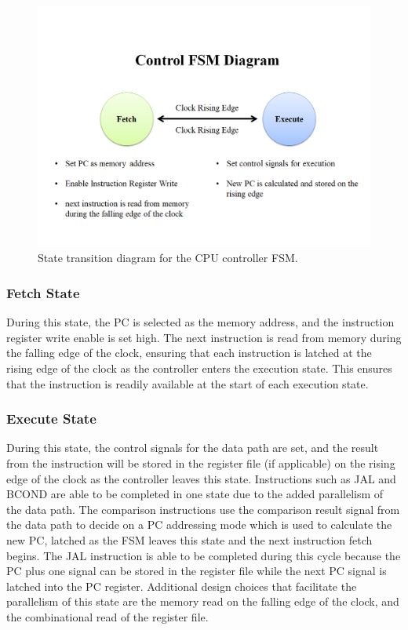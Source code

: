 \documentclass[10pt, portrait, letterpaper]{article}
\begin{document}
  \begin{figure}[h]
    \centering
    \includegraphics[width=5in]{fsm diagram.PNG}
    \caption{State transition diagram for the CPU controller FSM.}\label{fig:fsm}
  \end{figure}

  \subsubsection{Fetch State}
  During this state, the PC is selected as the memory address, and the 
  instruction register write enable is set high. 
  The next instruction is read from memory during the falling edge of the 
  clock, ensuring that each instruction is latched at the rising edge of the 
  clock as the controller enters the execution state. 
  This ensures that the instruction is readily
  available at the start of each execution state. 

  \subsubsection{Execute State}
  During this state, the control signals for the data path are set, 
  and the result from the instruction will be stored in the 
  register file (if applicable)
  on the rising edge of the clock as the controller leaves this state.
  Instructions such as JAL and BCOND are able to be completed in 
  one state due to the added parallelism of the data path.
  The comparison instructions use the comparison result signal 
  from the data path to decide on a PC addressing mode which is used 
  to calculate the new PC, latched as the FSM leaves this state 
  and the next instruction fetch begins.
  The JAL instruction is able to be completed during this cycle 
  because the PC plus one signal can be stored in the register 
  file while the next PC signal is latched into the PC register.
  Additional design choices that facilitate the parallelism of this state are 
  the memory read on the falling edge of the clock, and the combinational 
  read of the register file.
\end{document}
